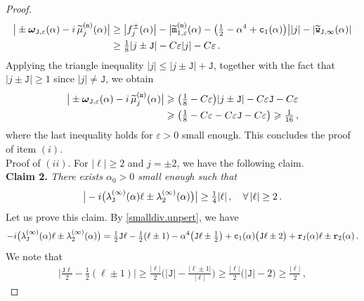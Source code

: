 \documentclass[10pt,a4paper]{amsart}
\newcommand{\bomega}{{\boldsymbol{\omega}}}
\newcommand{\im}{{\rm i}}
\newcommand{\tJ}{{\mathtt J}}
\newcommand{\tc}{{\mathtt c}}
\newcommand{\tm}{{\mathtt m}}
\newcommand{\tn}{{\mathtt n}}
\newcommand{\tr}{{\mathtt r}}
\newcommand{\tw}{{\mathtt w}}
\newcommand{\wt}[1]{{\widetilde{#1}}}
\begin{document}
\begin{proof}
\begin{align}
  	 \big| \pm \bomega_{\tJ,\varepsilon}(\alpha)  -\im\,\wt\mu_{j}^{(\tn)}(\alpha) \big| &  \geq \big|f_j^{\pm}(\alpha) \big| - \big| \wt\tm_{1,\varepsilon}^{(\tn)}(\alpha) - \big( \tfrac12 -\alpha^4 + \tc_{1}(\alpha) \big)  \big| |j| - |\wt\tw_{\tJ,\infty}(\alpha)| \\
  	 & \geq \tfrac18|j\pm \tJ| - C\varepsilon |j| -C\varepsilon \,.
  \end{align}
  Applying the triangle inequality $|j| \leqslant |j \pm \tJ| + \tJ$, together with the fact that $|j \pm \tJ| \geqslant 1$ since $|j|\neq \tJ$, we obtain
  \begin{align}
  	 \big| \pm \bomega_{\tJ,\varepsilon}(\alpha)  -\im\,\wt\mu_{j}^{(\tn)}(\alpha) \big| 
  	 & \geqslant \big(\tfrac18-C \varepsilon\big)|j\pm \tJ| -C\varepsilon \tJ-C\varepsilon\\
     &\geqslant  \big(\tfrac18-C \varepsilon-C\varepsilon \tJ-C\varepsilon\big)\geqslant  \tfrac{1}{16}\,,
  \end{align}
  where the last inequality holds for $\varepsilon>0$ small enough. This concludes the proof of item $(i)$.
  \\[1mm]
   {\sc Proof of $(ii)$}. For $|\ell |\geq 2$ and $j=\pm 2$, we have the following claim.
  \\[1mm]
  {\bf Claim 2.} {\it There exists $\alpha_{0}>0$ small enough such that}
  \begin{equation}\label{claim-2}
  	\big|  	-\im\big(  \lambda_{\tJ}^{(\infty)}(\alpha) \ell  \pm \lambda_{2}^{(\infty)} (\alpha) \big)   \big| \geq \tfrac14 |\ell|\,, \quad \forall \,|\ell| \geq 2 \,.
  \end{equation}
Let us prove this claim. 
  By \eqref{smalldiv.unpert}, we have
  	\begin{equation}
  		-\im\big(  \lambda_{\tJ}^{(\infty)}(\alpha) \ell  \pm \lambda_{2}^{(\infty)} (\alpha) \big)  
  		 = \tfrac12 \tJ \ell - \tfrac12 (\ell\pm 1) - \alpha^4 \big( \tJ \ell \pm\tfrac12 \big) + \tc_{1}(\alpha) \big( \tJ \ell \pm 2 \big) + \tr_{\tJ}(\alpha)\ell \pm \tr_{2}(\alpha) \,.
  	\end{equation}
  	We note that
  	\begin{align}
  		\big|  \tfrac{\tJ \ell}{2} - \tfrac12 (\ell\pm 1)\big| \geq \tfrac{|\ell|}{2}  \big( |\tJ|- \tfrac{|\ell \pm 1|}{|\ell|} \big) \geq \tfrac{|\ell|}{2}   \big( |\tJ| - 2 \big) \geq \tfrac{|\ell|}{2}  \,,

\end{align}
\end{proof}
\end{document}
